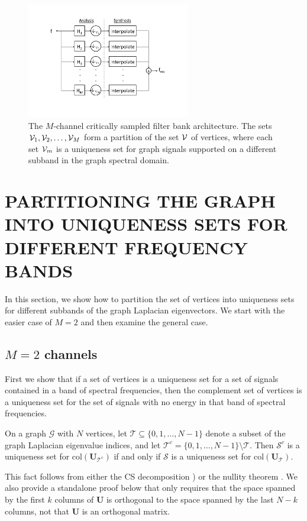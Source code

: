 \documentclass{article}
\begin{document}
\begin{figure}[t]
\centerline{\includegraphics[width=2.8in]{fig_mcsfb_structure3}}
\caption{The $M$-channel critically sampled filter bank architecture. The sets ${\mathcal{V}}_1, {\mathcal{V}}_2, \ldots,{\mathcal{V}}_M$ form a partition of the set ${\mathcal{V}}$ of vertices, where each set ${\mathcal{V}}_m$ is a uniqueness set for graph signals supported on a different subband in the graph spectral domain.}\label{Fig:arch}
\end{figure}




\section{PARTITIONING THE GRAPH INTO UNIQUENESS SETS FOR DIFFERENT FREQUENCY BANDS}\label{Se:partition}

In this section, we show how to partition the set of vertices into uniqueness sets for different subbands of the graph Laplacian eigenvectors. We start with the easier case of $M=2$ and then examine the general case.

\subsection{$M=2$ channels}
First we show that if a set of vertices is a uniqueness set for a set of signals contained in a band of spectral frequencies, then the complement set of vertices is a uniqueness set for the set of signals with no energy in that band of spectral frequencies.
\begin{proposition}\label{Le:highpass_uniqueness}
On a graph ${\mathcal G}$ with $N$ vertices, let 
${\mathcal T} \subseteq \{0,1,\ldots,N-1\}$ denote a subset of the graph Laplacian eigenvalue indices, and let ${\mathcal T}^c=\{0,1,\ldots,N-1\} \setminus {\mathcal T}$.
Then 
$\mathcal{S}^c$ is a uniqueness set for $\mbox{col}({\mathbf{U}}_{{\mathcal T}^c})$
 if and only if
$\mathcal{S}$ is a uniqueness set for 
$\mbox{col}({\mathbf{U}}_{{\mathcal T}})$.
\end{proposition}
This fact follows from either the CS decomposition \cite[Equation (32)]{paige})
or the nullity theorem \cite[Theorem 2.1]{strangInterplay}.  
We also provide a standalone proof below that only requires that the space spanned by the first $k$ columns of ${\mathbf{U}}$ is orthogonal to the space spanned by the last $N-k$ columns, not that ${\mathbf{U}}$ is an orthogonal matrix.
\end{document}
